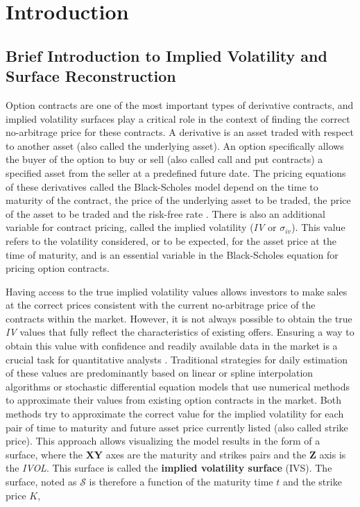 \section{Introduction}
\subsection{Brief Introduction to Implied Volatility and Surface Reconstruction}
Option contracts are one of the most important types of derivative contracts, and implied volatility surfaces play a critical role in the context of finding the correct no-arbitrage price \citep{Ludkovski2023} for these contracts. A derivative is an asset traded with respect to another asset (also called the underlying asset). An option specifically allows the buyer of the option to buy or sell (also called call and put contracts) a specified asset from the seller at a predefined future date. The pricing equations of these derivatives called the Black-Scholes model depend on the time to maturity of the contract, the price of the underlying asset to be traded, the price of the asset to be traded and the risk-free rate \citep{Black1973}. There is also an additional variable for contract pricing, called the implied volatility (\textit{IV} or $\sigma_{iv}$). This value refers to the volatility considered, or to be expected, for the asset price at the time of maturity, and is an essential variable in the Black-Scholes equation for pricing option contracts.

Having access to the true implied volatility values allows investors to make sales at the correct prices consistent with the current no-arbitrage price of the contracts within the market. However, it is not always possible to obtain the true \textit{IV} values that fully reflect the characteristics of existing offers. Ensuring a way to obtain this value with confidence and readily available data in the market is a crucial task for quantitative analysts \citep{Kim2006}. Traditional strategies for daily estimation of these values are predominantly based on linear or spline interpolation algorithms \citep{Homescu2011} or stochastic differential equation models \citep{Jordan2011} that use numerical methods to approximate their values from existing option contracts in the market. Both methods try to approximate the correct value for the implied volatility for each pair of time to maturity and future asset price currently listed (also called strike price). This approach allows visualizing the model results in the form of a surface, where the \textbf{XY} axes are the maturity and strikes pairs and the \textbf{Z} axis is the \textit{IVOL}. This surface is called the \textbf{implied volatility surface} (IVS). The surface, noted as $\mathcal{S}$ is therefore a function of the maturity time $t$ and the strike price $K$,

